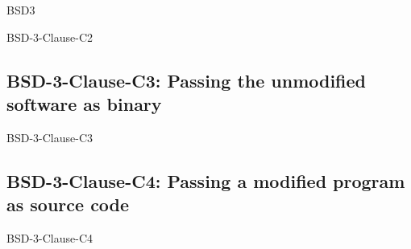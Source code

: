 \begin{license}{BSD3}
\begin{lsuc}{BSD-3-Clause-C2}
  \begin{lsucrequires}
    \lsucmandatory{\keepLicenseElements}
  \end{lsucrequires}

  \begin{lsucprohibits}
    \lsucitem{\dontUseAuthorNames}%
  \end{lsucprohibits}
\end{lsuc}

\subsection{BSD-3-Clause-C3: Passing the unmodified software as binary}
\begin{lsuc}{BSD-3-Clause-C3}

  \lsucmeans{\useCaseThree}
  \lsuccovers{\coversThree}

  \begin{lsucrequires}  
    \lsucmandatory{\insertLicenseIntoBinary}\passingFilesCorrectly
  \end{lsucrequires}

  \begin{lsucprohibits}
    \lsucitem{\dontUseAuthorNames}%
  \end{lsucprohibits}
\end{lsuc}

\subsection{BSD-3-Clause-C4: Passing a modified program as source code}
\begin{lsuc}{BSD-3-Clause-C4}

  \lsucmeans{\useCaseFour}
  \lsuccovers{\coversFour}

  \begin{lsucrequires}
    \lsucmandatory{\keepLicenseElements}
    \lsucoptional{\addLicenseToCopyrightMessage}
  \end{lsucrequires}

  \begin{lsucprohibits}
    \lsucitem{\dontUseAuthorNames}%
  \end{lsucprohibits}
\end{lsuc}


\end{license}
